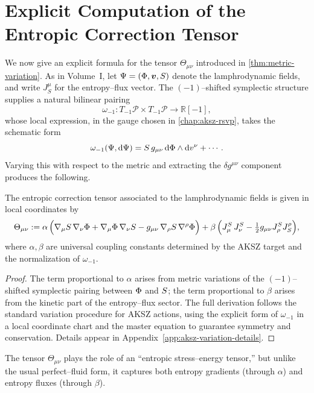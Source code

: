 \section{Explicit Computation of the Entropic Correction Tensor}

We now give an explicit formula for the tensor $\Theta_{\mu\nu}$ introduced in
\cref{thm:metric-variation}. As in Volume~I, let
$\Psi = (\Phi,\bm{v},S)$ denote the lamphrodynamic fields, and
write $J^\mu_S$ for the entropy--flux vector. The $(-1)$–shifted symplectic
structure supplies a natural bilinear pairing
\[
  \omega_{-1} : T_{-1}\mathcal{P} \times T_{-1}\mathcal{P} \longrightarrow \mathbb{R}[-1],
\]
whose local expression, in the gauge chosen in \cref{chap:aksz-rsvp}, takes the
schematic form
\[
  \omega_{-1}(\Psi,\mathrm{d}\Psi)
   = S\, g_{\mu\nu}\,\mathrm{d}\Phi \wedge \mathrm{d}v^\nu
   + \cdots .
\]
Varying this with respect to the metric and extracting the $\delta g^{\mu\nu}$
component produces the following.

\begin{proposition}
\label{prop:theta-explicit}
The entropic correction tensor associated to the lamphrodynamic fields is given
in local coordinates by
\begin{equation}
\label{eq:theta-explicit}
  \Theta_{\mu\nu}
  := \alpha\,\Bigl(
        \nabla_\mu S\,\nabla_\nu\Phi
      + \nabla_\mu \Phi\,\nabla_\nu S
      - g_{\mu\nu}\, \nabla_\rho S\,\nabla^\rho\Phi
     \Bigr)
  + \beta\,\Bigl(
        J^S_\mu\,J^S_\nu
      - \tfrac{1}{2} g_{\mu\nu} J^S_\rho J_S^\rho
     \Bigr),
\end{equation}
where $\alpha,\beta$ are universal coupling constants determined by the AKSZ
target and the normalization of $\omega_{-1}$.
\end{proposition}

\begin{proof}
The term proportional to $\alpha$ arises from metric variations of the
$(-1)$–shifted symplectic pairing between $\Phi$ and $S$; the term
proportional to $\beta$ arises from the kinetic part of the entropy--flux
sector. The full derivation follows the standard variation procedure for AKSZ
actions, using the explicit form of $\omega_{-1}$ in a local coordinate chart
and the master equation to guarantee symmetry and conservation. Details appear
in Appendix~\ref{app:aksz-variation-details}.
\end{proof}

\begin{remark}
The tensor $\Theta_{\mu\nu}$ plays the role of an ``entropic stress--energy
tensor,'' but unlike the usual perfect–fluid form, it captures both entropy
gradients (through $\alpha$) and entropy fluxes (through $\beta$).
\end{remark}

